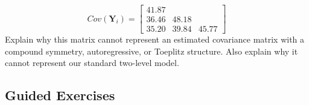\documentclass[
]{krantz}
\begin{document}
\begin{enumerate}
  \[ Cov(\mathbf{Y}_i) =  \left[
        \begin{array}{cccc}
          41.87 & &   \\
          36.46 & 48.18 &  \\
          35.20 & 39.84 & 45.77
        \end{array} \right] \]
  Explain why this matrix cannot represent an estimated covariance matrix with a compound symmetry, autoregressive, or Toeplitz structure. Also explain why it cannot represent our standard two-level model.
\end{enumerate}

\hypertarget{guided-exercises-7}{%
\subsection{Guided Exercises}\label{guided-exercises-7}}
\end{document}
